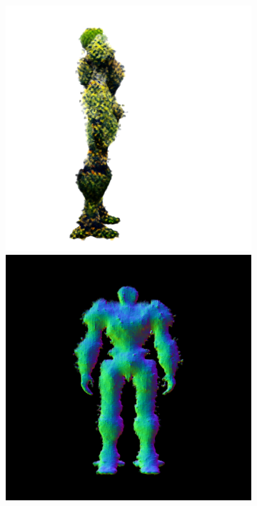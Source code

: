 \begin{figure}[ht]
\begin{subfigure}[b]{0.222\textwidth}
        \includegraphics[width=\textwidth]{etc/a robot made out of plants/magic123/magic123_coarse_robot_right_10000_part1.png}
        \includegraphics[width=\textwidth]{etc/a robot made out of plants/magic123/magic123_coarse_robot_back_10000_part2.png}

\end{subfigure}
\end{figure}
